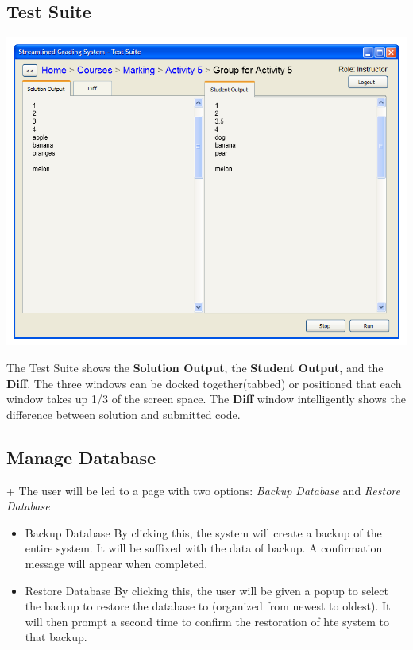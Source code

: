 \documentclass{article}
\begin{document}
\subsection{Test Suite}
\begin{center}
\includegraphics[scale=0.6]{../images/UIMockups/PNG_Renders/SRS_TestSuite_Split}
\end{center}
The Test Suite shows the \textbf{Solution Output}, the \textbf{Student Output}, and the \textbf{Diff}.  
The three windows can be docked together(tabbed) or positioned that each
window takes up 1/3 of the screen space.
The \textbf{Diff} window intelligently shows the difference between
solution and submitted code.

\subsection{Manage Database}
+%
The user will be led to a page with two options: \emph{Backup Database} and \emph{Restore Database}
\begin{itemize}
  \item Backup Database
By clicking this, the system will create a backup of the entire system. It will be suffixed with the data of backup. A confirmation message will appear when completed.
  \item Restore Database
By clicking this, the user will be given a popup to select the backup to restore the database to (organized from newest to oldest). It will then prompt a second time to confirm the restoration of hte system to that backup.
\end{itemize}
\end{document}
